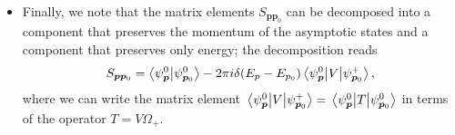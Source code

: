 \documentclass[11pt, a4paper]{article}
\newcommand{\diff}{\mathop{}\!\mathrm{d}} %
\newcommand{\ddp}{\diff^{3} \vec{p}}  %
\newcommand{\Mol}{M\o ller\xspace}
\renewcommand{\vec}[1]{\bm{#1}}  %
\begin{document}
\begin{itemize}
    The scattering states, like the asymptotic states, thus form a complete system of basis vectors so that we can expand the state $ \ket{\psi_{\vec{p}_{0}}^{0}} $ in the basis $ \{\ket{\psi_{\vec{p}}^{0}}\} $ to get
    \begin{equation*}
        \ket{\psi_{\vec{p}_{0}}^{+}} = \int \ket{\psi_{\vec{p}}^{-}} \braket{\psi_{\vec{p}}^{-}}{\psi_{\vec{p}_{0}}^{+}}\ddp  = \Omega_{+} \ket{\psi_{\vec{p}_{0}}^{0}}.
    \end{equation*}
    As time approaches $ t \to \infty $, the state $ \ket{\psi_{\vec{p}}^{-}} $ uniquely evolves into the asymptotic state $ \ket{\psi_{\vec{p}}^{0}} $. As a result, the probability amplitude $ \braket{\psi_{\vec{p}}^{-}}{\psi_{\vec{p}_{0}}^{+}} $ equals $ S_{\vec{p}\vec{p}_{0}} $, i.e.
    \begin{equation*}
        S_{\vec{p}\vec{p}_{0}} = \mel{\psi_{\vec{p}}^{0}}{S}{\psi_{\vec{p}_{0}}^{0}} = \braket{\psi_{\vec{p}}^{-}}{\psi_{\vec{p}_{0}}^{+}} = \mel{\psi_{\vec{p}}^{0}}{\Omega_{-}^{\dagger}\Omega_{+}}{\psi_{\vec{p}_{0}}^{0}}.
    \end{equation*}
    As a result, the scattering operator can be written in terms of the \Mol operator as
    \begin{equation*}
        S = \Omega_{-}^{\dagger}\Omega_{+}.
    \end{equation*}
    
    \item Finally, we note that the matrix elements $ S_{\vec{p}\vec{p}_{0}} $ can be decomposed into a component that preserves the momentum of the asymptotic states and a component that preserves only energy; the decomposition reads
    \begin{equation*}
        S_{\vec{p}\vec{p}_{0}} = \braket{\psi_{\vec{p}}^{0}}{\psi_{\vec{p}_{0}}^{0}} - 2\pi i \delta(E_{p} - E_{p_{0}})\mel{\psi_{\vec{p}}^{0}}{V}{\psi_{\vec{p}_{0}}^{+}},
    \end{equation*}
    where we can write the matrix element $ \mel{\psi_{\vec{p}}^{0}}{V}{\psi_{\vec{p}_{0}}^{+}} = \mel{\psi_{\vec{p}}^{0}}{T}{\psi_{\vec{p}_{0}}^{0}} $ in terms of the operator $ T = V\Omega_{+} $.
    
    
\end{itemize}
\end{document}
